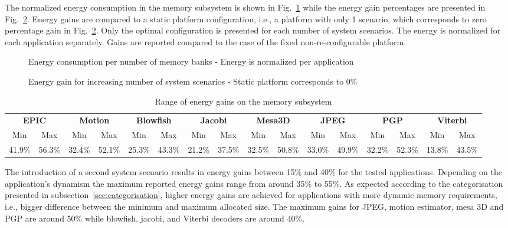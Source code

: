 \documentclass{acm_proc_article-sp}
\begin{document}
The normalized energy consumption in the memory subsystem is shown in Fig.~\ref{fig:energy} while the energy gain percentages are presented in Fig.~\ref{fig:gains}. Energy gains are compared to a static platform configuration, i.e., a platform with only 1 scenario, which corresponds to zero percentage gain in Fig.~\ref{fig:gains}. Only the optimal configuration is presented for each number of system scenarios. The energy is normalized for each application separately. Gains are reported compared to the case of the fixed non-re-configurable platform.
\begin{figure}[!t]
\centering
\caption{Energy consumption per number of memory banks - Energy is normalized per application}
\label{fig:energy}
\end{figure}
\begin{figure}[!t]
\centering
\caption{Energy gain for increasing number of system scenarios - Static platform corresponds to 0\%}
\label{fig:gains}
\end{figure}
\begin{center}
	\begin{table*}[!t]
	\caption{Range of energy gains on the memory subsystem}
	\label{tab:ranges}
	{\small
	\hfill{}
	\begin{tabular}{|c|c|c|c|c|c|c|c|c|c|c|c|c|c|c|c|}
		\hline
		\multicolumn{2}{|c|}{\textbf{EPIC}} &
		\multicolumn{2}{c|}{\textbf{Motion}} &
		\multicolumn{2}{c|}{\textbf{Blowfish}} &
		\multicolumn{2}{c|}{\textbf{Jacobi}} &
		\multicolumn{2}{c|}{\textbf{Mesa3D}} &
		\multicolumn{2}{c|}{\textbf{JPEG}} &
		\multicolumn{2}{c|}{\textbf{PGP}} &
		\multicolumn{2}{c|}{\textbf{Viterbi}} \\ 
		\cline{1-16}
		Min & Max & Min & Max & Min & Max & 
		Min & Max & Min & Max & Min & Max & 
		Min & Max & Min & Max\\ 
		\hline 
		41.9\% & 56.3\% & 32.4\% & 52.1\% & 25.3\% & 43.3\% & 
		21.2\% & 37.5\% & 32.5\% & 50.8\% & 33.0\% & 49.9\% & 
		32.2\% & 52.3\% & 13.8\% & 43.5\% \\ 
		\hline 
	\end{tabular}}
	\end{table*}
\end{center}
The introduction of a second system scenario results in energy gains between 15\% and  40\%  for the tested applications. Depending on the application's dynamism the maximum reported energy gains range from around 35\% to 55\%. As expected according to the categorisation presented in subsection~\ref{sec:categorisation}, higher energy gains are achieved for applications with more dynamic memory requirements, i.e., bigger difference between the minimum and maximum allocated size. The maximum gains for JPEG, motion estimator, mesa 3D and PGP are around 50\% while blowfish, jacobi, and Viterbi decoders are around 40\%.
\end{document}
